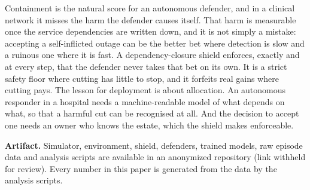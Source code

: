 \documentclass[conference,compsoc]{IEEEtran}
\begin{document}
Containment is the natural score for an autonomous defender, and in a
clinical network it misses the harm the defender causes itself. That harm
is measurable once the service dependencies are written down, and it is
not simply a mistake: accepting a self-inflicted outage can be the better
bet where detection is slow and a ruinous one where it is fast. A
dependency-closure shield enforces, exactly and at every step, that the
defender never takes that bet on its own. It is a strict safety floor where
cutting has little to stop, and it forfeits real gains where cutting pays.
The lesson for deployment is about allocation. An autonomous responder in a
hospital needs a machine-readable model of what depends on what, so that a
harmful cut can be recognised at all. And the decision to accept one needs
an owner who knows the estate, which the shield makes enforceable.

\textbf{Artifact.} Simulator, environment, shield, defenders, trained
models, raw episode data and analysis scripts are available in an
anonymized repository (link withheld for review). Every number in this
paper is generated from the data by the analysis scripts.



\end{document}
